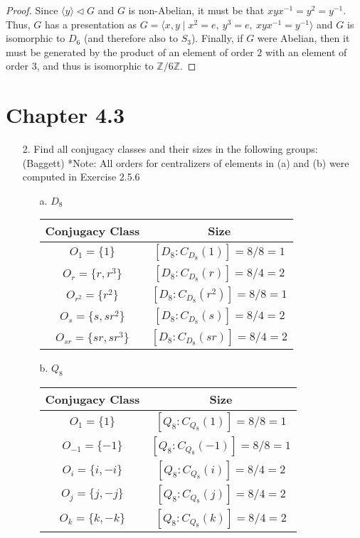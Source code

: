 \documentclass[10pt]{article}
\newcommand{\Z}{\mathbb{Z}}
\begin{document}
\begin{itemize}
\begin{proof}
Since $\langle y \rangle \lhd G$ and $G$ is non-Abelian, it must be
that $xyx^{-1} = y^2 = y^{-1}$.  Thus, $G$ has a presentation as $G
= \langle x, y \mid x^2 = e,~y^3 = e,~xyx^{-1} = y^{-1} \rangle$ and
$G$ is isomorphic to $D_6$ (and therefore also to $S_3$).  Finally,
if $G$ were Abelian, then it must be generated by the product of an
element of order $2$ with an element of order $3$, and thus is
isomorphic to $\Z/6\Z$.
\end{proof}

\end{itemize}

\section*{Chapter 4.3}

\begin{itemize}

\item[2.]Find all conjugacy classes and their sizes in the following groups: \\
(Baggett) *Note: All orders for centralizers of elements in (a) and
(b) were computed in Exercise 2.5.6
\begin{itemize}

\item[a.] $D_8$
\begin{center}
\begin{tabular}{cc}
Conjugacy Class & Size\\
\hline
$O_1 = \{1\}$ & $[D_8:C_{D_8}(1)] = 8/8 = 1$\\
$O_r = \{r, r^3\}$ & $[D_8:C_{D_8}(r)] = 8/4 = 2$\\
$O_{r^2} = \{r^2\}$ & $[D_8:C_{D_8}(r^2)] = 8/8 = 1$\\
$O_s = \{s, sr^2\}$ & $[D_8:C_{D_8}(s)] = 8/4 = 2$\\
$O_{sr} = \{sr, sr^3\}$ & $[D_8:C_{D_8}(sr)] = 8/4 = 2$
\end{tabular}
\end{center}

\item[b.] $Q_8$
\begin{center}
\begin{tabular}{cc}
Conjugacy Class & Size\\
\hline
$O_1 = \{1\}$ & $[Q_8:C_{Q_8}(1)] = 8/8 = 1$\\
$O_{-1} = \{-1\}$ & $[Q_8:C_{Q_8}(-1)] = 8/8 = 1$\\
$O_i = \{i, -i\}$ & $[Q_8:C_{Q_8}(i)] = 8/4 = 2$\\
$O_j = \{j, -j\}$ & $[Q_8:C_{Q_8}(j)] = 8/4 = 2$\\
$O_k = \{k, -k\}$ & $[Q_8:C_{Q_8}(k)] = 8/4 = 2$
\end{tabular}
\end{center}


\end{itemize}
\end{itemize}
\end{document}
